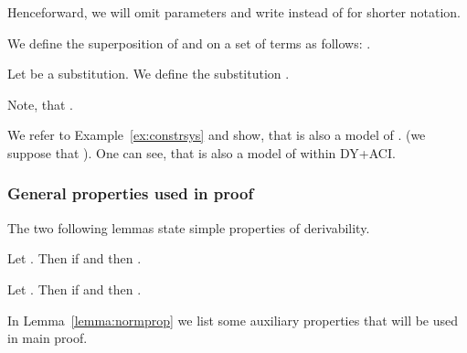 Henceforward, we will omit parameters and write  instead of  for shorter notation.


\begin{df}
 We define the superposition of  and  on a set of terms  as follows: .
\end{df}

\begin{df}
 Let   be a substitution. We  define  the  substitution .

\end{df}
Note, that .

\begin{example}\label{ex:constrsysmodel}
 We refer to Example~\ref{ex:constrsys} and show, that  is also a model of .
 (we suppose that ).
One can see, that  is also a model of  within DY+ACI.
\end{example}



\subsubsection{General properties used in proof}

The two following lemmas state simple properties of derivability.

\begin{lemma}\label{lemma:dertrans}
 Let . Then if  and  then .

\end{lemma}

\begin{lemma}\label{lemma:derext}
 Let . Then if  and  then .

\end{lemma}

In Lemma~\ref{lemma:normprop} we list some auxiliary properties that will be used in main proof.



